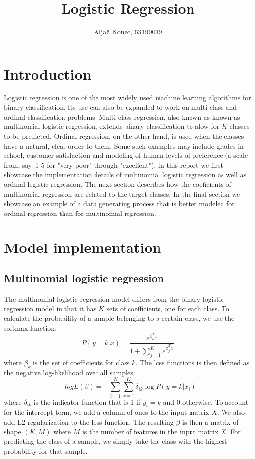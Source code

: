 \documentclass[9pt]{IEEEtran}
\title{\vspace{0ex}Logistic Regression}
\author{Aljaž Konec, 63190019\vspace{-4.0ex}}
\date{}
\begin{document}
\maketitle

\section{Introduction}

Logistic regression is one of the most widely used machine learning algorithms for binary classification.
Its use can also be expanded to work on multi-class and ordinal classification problems.
Multi-class regression, also known as known as multinomial logistic regression, extends binary classification to alow for $K$ classes to be predicted.
Ordinal regression, on the other hand, is used when the classes have a natural, clear order to them.
Some such examples may include grades in school, customer satisfaction and modeling of human levels of preference (a scale from, say, 1-5 for "very poor" through "excellent").
In this report we first showcase the implementation details of multinomial logistic regression as well as ordinal logistic regression.
The next section describes how the coeficients of multinomial regression are related to the target classes.
In the final section we showcase an example of a data generating process that is better modeled for ordinal regression than for multinomial regression.


\section{Model implementation}

\subsection*{Multinomial logistic regression}
The multinomial logistic regression model differs from the binary logistic regression model in that it has $K$ sets of coefficients, one for each class.
To calculate the probability of a sample belonging to a certain class, we use the softmax function:
\begin{equation}
    P(y = k | x) = \frac{e^{\beta_k^T x}}{1 + \sum_{j=1}^{K} e^{\beta_j^T x}}
\end{equation}
where $\beta_k$ is the set of coefficients for class $k$.
The loss functions is then defined as the negative log-likelihood over all samples:
\begin{equation}
    -logL(\beta) = -\sum_{i=1}^{N} \sum_{k=1}^{K} \delta_{ik} \log P(y = k | x_i)
\end{equation}
where $\delta_{ik}$ is the indicator function that is 1 if $y_i = k$ and 0 otherwise.
To account for the intercept term, we add a column of ones to the input matrix $X$.
We also add L2 regularization to the loss function.
The resulting $\beta$ is then a matrix of shape $(K, M)$ where $M$ is the number of features in the input matrix $X$.
For predicting the class of a sample, we simply take the class with the highest probability for that sample.
\end{document}
